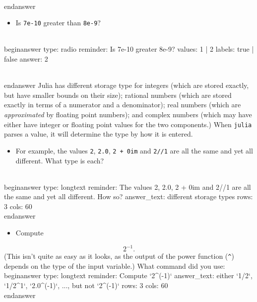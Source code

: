 \documentclass[12pt]{article}
\begin{document}
\\end{answer}
\begin{itemize}\item  Is \texttt{7e-10}  greater than \texttt{8e-9}?\end{itemize}
\\begin{answer}
type: radio
reminder: Is 7e-10 greater 8e-9?
values: 1 | 2
labels: true | false
answer: 2

\\end{answer}
\newline
Julia has different storage type for integers (which are stored exactly, but have smaller bounds on their size); rational numbers (which are stored exactly in terms of a numerator and a denominator); real numbers (which are \textit{approximated} by floating point numbers); and complex numbers (which may have either have integer or floating point values for the two components.) When \texttt{julia} parses a value, it will determine the type by how it is entered.\begin{itemize}\item For example, the values \texttt{2}, \texttt{2.0}, \texttt{2 + 0im} and \texttt{2//1} are all the same and yet all different. What type is each?\end{itemize}
\\begin{answer}
type: longtext
reminder: The values 2, 2.0, 2 + 0im and 2//1 are all the same and yet all different. How so?
answer_text: different storage types 
rows: 3
cols: 60
\\end{answer}
\begin{itemize}\item Compute \end{itemize}
$$
2^{-1}.
$$
\newline
(This isn't quite as easy as it looks, as the output of the power function (\texttt{^}) depends on the type of the input variable.)\newline
What command did you use:
\\begin{answer}
type: longtext
reminder: Compute `2^(-1)`
answer_text: either `1/2`, `1/2^1`, `2.0^(-1)`, ..., but not `2^(-1)` 
rows: 3
cols: 60
\\end{answer}
\end{document}
